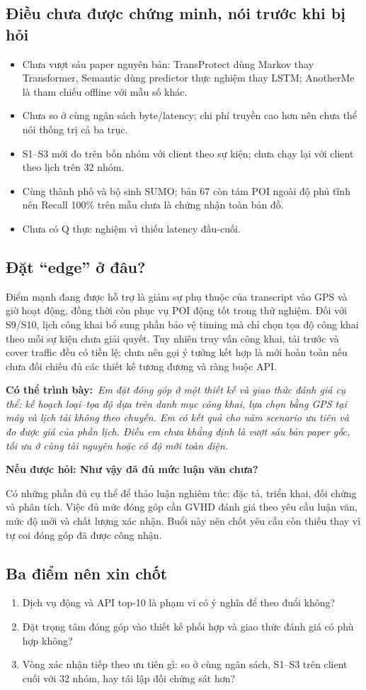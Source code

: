 \documentclass[10pt,a4paper]{article}
\newcommand{\say}[1]{\par\textbf{Có thể trình bày:}\ \textit{#1}\par}
\newcommand{\ask}[2]{\par\textbf{Nếu được hỏi: #1}\par #2\par}
\begin{document}
\subsection*{Điều chưa được chứng minh, nói trước khi bị hỏi}
\begin{itemize}
\item Chưa vượt sáu paper nguyên bản: TransProtect dùng Markov thay Transformer, Semantic dùng predictor thực nghiệm thay LSTM; AnotherMe là tham chiếu offline với mẫu số khác.
\item Chưa so ở cùng ngân sách byte/latency; chi phí truyền cao hơn nên chưa thể nói thống trị cả ba trục.
\item S1--S3 mới đo trên bốn nhóm với client theo sự kiện; chưa chạy lại với client theo lịch trên 32 nhóm.
\item Cùng thành phố và bộ sinh SUMO; bản 67 còn tám POI ngoài độ phủ tĩnh nên Recall 100\% trên mẫu chưa là chứng nhận toàn bản đồ.
\item Chưa có Q thực nghiệm vì thiếu latency đầu-cuối.
\end{itemize}

\subsection*{Đặt ``edge'' ở đâu?}
Điểm mạnh đang được hỗ trợ là giảm sự phụ thuộc của transcript vào GPS và giờ hoạt động, đồng thời còn phục vụ POI động tốt trong thử nghiệm. Đối với S9/S10, lịch công khai bổ sung phần bảo vệ timing mà chỉ chọn tọa độ công khai theo mỗi sự kiện chưa giải quyết. Tuy nhiên truy vấn công khai, tải trước và cover traffic đều có tiền lệ; chưa nên gọi ý tưởng kết hợp là mới hoàn toàn nếu chưa đối chiếu đủ các thiết kế tương đương và ràng buộc API.

\say{Em đặt đóng góp ở một thiết kế và giao thức đánh giá cụ thể: kế hoạch loại--tọa độ dựa trên danh mục công khai, lựa chọn bằng GPS tại máy và lịch tải không theo chuyến. Em có kết quả cho năm scenario ưu tiên và đo được giá của phần lịch. Điều em chưa khẳng định là vượt sáu bản paper gốc, tối ưu ở cùng tài nguyên hoặc có độ mới toàn diện.}

\ask{Như vậy đã đủ mức luận văn chưa?}{Có những phần đủ cụ thể để thảo luận nghiêm túc: đặc tả, triển khai, đối chứng và phân tích. Việc đủ mức đóng góp cần GVHD đánh giá theo yêu cầu luận văn, mức độ mới và chất lượng xác nhận. Buổi này nên chốt yêu cầu còn thiếu thay vì tự coi đóng góp đã được công nhận.}

\subsection*{Ba điểm nên xin chốt}
\begin{enumerate}
\item Dịch vụ động và API top-10 là phạm vi có ý nghĩa để theo đuổi không?
\item Đặt trọng tâm đóng góp vào thiết kế phối hợp và giao thức đánh giá có phù hợp không?
\item Vòng xác nhận tiếp theo ưu tiên gì: so ở cùng ngân sách, S1--S3 trên client cuối với 32 nhóm, hay tái lập đối chứng sát hơn?
\end{enumerate}
\end{document}
